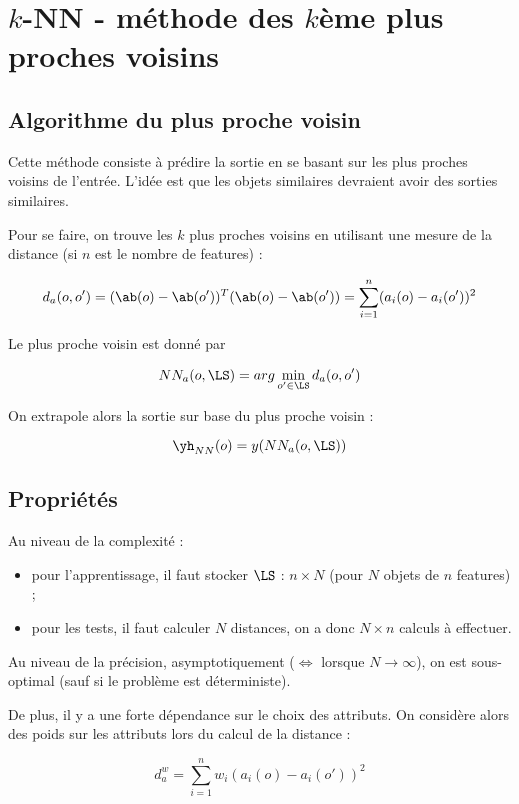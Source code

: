 \chapter{$k$-NN - méthode des $k$ème plus proches voisins}

	\section{Algorithme du plus proche voisin}
		
	Cette méthode consiste à prédire la sortie en se basant sur les plus proches voisins de l'entrée. L'idée est que les objets similaires devraient avoir des sorties similaires.
		
		
	Pour se faire, on trouve les $k$ plus proches voisins en utilisant une mesure de la distance (si $n$ est le nombre de features) :
	
	$$d_a(o, o') = (\ab(o) - \ab(o'))^T(\ab(o) - \ab(o')) = \sum_{i = 1}^n(a_i(o) - a_i(o'))^2$$
	
	Le plus proche voisin est donné par
	
	$$NN_a(o, \LS) = arg \min_{o' \in \LS} d_a(o, o')$$
	
	On extrapole alors la sortie sur base du plus proche voisin :
	
	$$\yh_{NN}(o) = y(NN_a(o, \LS))$$
	
	\section{Propriétés}
	
	Au niveau de la complexité :
	
	\begin{itemize}
		\item pour l'apprentissage, il faut stocker $\LS$ : $n \times N$ (pour $N$ objets de $n$ features) ;
		\item pour les tests, il faut calculer $N$ distances, on a donc $N \times n$ calculs à effectuer.
	\end{itemize}
	
	Au niveau de la précision, asymptotiquement ($\Leftrightarrow$ lorsque $N \rightarrow \infty$), on est sous-optimal (sauf si le problème est déterministe).
	
	De plus, il y a une forte dépendance sur le choix des attributs. On considère alors des poids sur les attributs lors du calcul de la distance :
	
	$$d_a^w = \sum_{i = 1}^n w_i (a_i(o) - a_i(o'))^2$$
	
